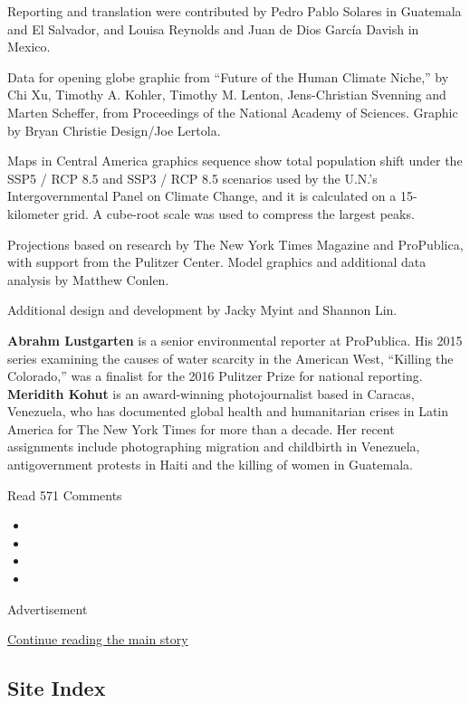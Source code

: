 Reporting and translation were contributed by Pedro Pablo Solares in
Guatemala and El Salvador, and Louisa Reynolds and Juan de Dios García
Davish in Mexico.

Data for opening globe graphic from ``Future of the Human Climate
Niche,'' by Chi Xu, Timothy A. Kohler, Timothy M. Lenton, Jens-Christian
Svenning and Marten Scheffer, from Proceedings of the National Academy
of Sciences. Graphic by Bryan Christie Design/Joe Lertola.

Maps in Central America graphics sequence show total population shift
under the SSP5 / RCP 8.5 and SSP3 / RCP 8.5 scenarios used by the U.N.'s
Intergovernmental Panel on Climate Change, and it is calculated on a
15-kilometer grid. A cube-root scale was used to compress the largest
peaks.

Projections based on research by The New York Times Magazine and
ProPublica, with support from the Pulitzer Center. Model graphics and
additional data analysis by Matthew Conlen.

Additional design and development by Jacky Myint and Shannon Lin.

\textbf{Abrahm Lustgarten} is a senior environmental reporter at
ProPublica. His 2015 series examining the causes of water scarcity in
the American West, ``Killing the Colorado,'' was a finalist for the 2016
Pulitzer Prize for national reporting. \textbf{Meridith Kohut} is an
award-winning photojournalist based in Caracas, Venezuela, who has
documented global health and humanitarian crises in Latin America for
The New York Times for more than a decade. Her recent assignments
include photographing migration and childbirth in Venezuela,
antigovernment protests in Haiti and the killing of women in Guatemala.

Read 571 Comments

\begin{itemize}
\item
\item
\item
\item
\end{itemize}

Advertisement

\protect\hyperlink{after-bottom}{Continue reading the main story}

\hypertarget{site-index}{%
\subsection{Site Index}\label{site-index}}

